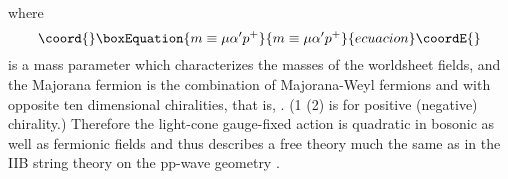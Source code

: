 \documentclass[a4paper,12pt]{article}
\numberwithin{equation}{section}
\begin{document}
where
\begin{equation}\coord{}\boxEquation{
m\equiv \mu \alpha' p^+
}{
m\equiv \mu \alpha' p^+
}{ecuacion}\coordE{}\end{equation}
is a mass parameter which characterizes the masses of the worldsheet
fields, and the Majorana fermion \myHighlight{$\theta$}\coordHE{} is the combination of
Majorana-Weyl fermions \coordHE{} and \coordHE{} with opposite ten
dimensional \coordHE{} chiralities, that is, \coordHE{}. (1 (2) is for positive (negative) chirality.)  Therefore
the light-cone gauge-fixed action \coordHE{} is quadratic in bosonic as
well as fermionic fields and thus describes a free theory much the
same as in the IIB string theory \cite{met044} on the pp-wave geometry
\cite{bla242}.
\end{document}
